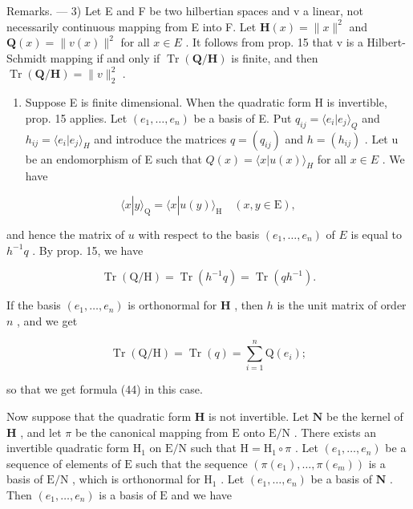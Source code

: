 Remarks. --- 3) Let E and F be two hilbertian spaces and v a linear, not necessarily continuous mapping from E into F. Let \(\mathbf{H}(x)=\|x\|^{2}\) and \(\mathbf{Q}(x)=\|v(x)\|^{2}\) for all \(x\in E\) . It follows from prop. 15 that v is a Hilbert-Schmidt mapping if and only if \(\operatorname{Tr}(\mathbf{Q}/\mathbf{H})\) is finite, and then \(\operatorname{Tr}(\mathbf{Q}/\mathbf{H})=\|v\|_{2}^{2}\) .

\begin{enumerate}
\def\labelenumi{\arabic{enumi})}
\setcounter{enumi}{3}
\tightlist
\item
  Suppose E is finite dimensional. When the quadratic form H is invertible, prop. 15 applies. Let \((e_{1}, \ldots, e_{n})\) be a basis of E. Put \(q_{ij} = \langle e_{i}|e_{j} \rangle_{Q}\) and \(h_{ij} = \langle e_{i}|e_{j} \rangle_{H}\) and introduce the matrices \(q = (q_{ij})\) and \(h = (h_{ij})\) . Let u be an endomorphism of E such that \(Q(x) = \langle x|u(x) \rangle_{H}\) for all \(x \in E\) . We have
\end{enumerate}

\[
\langle x | y \rangle_ {\mathrm{Q}} = \langle x | u (y) \rangle_ {\mathrm{H}} \quad (x, y \in \mathrm{E}),
\]

and hence the matrix of \(u\) with respect to the basis \((e_1, \ldots, e_n)\) of \(E\) is equal to \(h^{-1}q\) . By prop. 15, we have

\[
\operatorname{Tr} (\mathrm{Q} / \mathrm{H}) = \operatorname{Tr} (h ^ {- 1} q) = \operatorname{Tr} (q h ^ {- 1}).\tag{45}
\]

If the basis \((e_1, \dots, e_n)\) is orthonormal for \(\mathbf{H}\) , then \(h\) is the unit matrix of order \(n\) , and we get

\[
\operatorname{Tr} (\mathrm{Q} / \mathrm{H}) = \operatorname{Tr} (q) = \sum_ {i = 1} ^ {n} \mathrm{Q} (e _ {i});
\]

so that we get formula (44) in this case.

Now suppose that the quadratic form \(\mathbf{H}\) is not invertible. Let \(\mathbf{N}\) be the kernel of \(\mathbf{H}\) , and let \(\pi\) be the canonical mapping from \(\mathrm{E}\) onto \(\mathrm{E} / \mathrm{N}\) . There exists an invertible quadratic form \(\mathrm{H}_1\) on \(\mathrm{E} / \mathrm{N}\) such that \(\mathrm{H} = \mathrm{H}_1 \circ \pi\) . Let \((e_1, \dots, e_n)\) be a sequence of elements of \(\mathrm{E}\) such that the sequence \((\pi(e_1), \dots, \pi(e_m))\) is a basis of \(\mathrm{E} / \mathrm{N}\) , which is orthonormal for \(\mathrm{H}_1\) . Let \((e_1, \dots, e_n)\) be a basis of \(\mathbf{N}\) . Then \((e_1, \dots, e_n)\) is a basis of \(\mathrm{E}\) and we have

